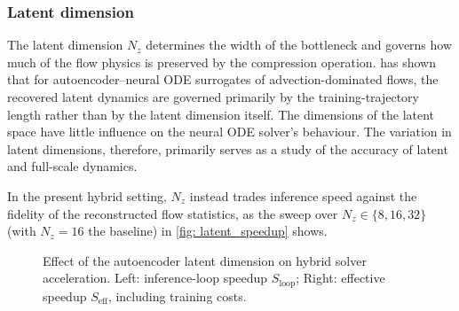 \subsubsection{Latent dimension}
The latent dimension $N_z$ determines the width of the bottleneck and governs how much of the flow physics is preserved by the compression operation. \textcite{Nair2024} has shown that for autoencoder--neural ODE surrogates of advection-dominated flows, the recovered latent dynamics are governed primarily by the training-trajectory length rather than by the latent dimension itself. The dimensions of the latent space have little influence on the neural ODE solver's behaviour. The variation in latent dimensions, therefore, primarily serves as a study of the accuracy of latent and full-scale dynamics. 

In the present hybrid setting, $N_z$ instead trades inference speed against the fidelity of the reconstructed flow statistics, as the sweep over $N_z \in \{8, 16, 32\}$ (with $N_z = 16$ the baseline) in \autoref{fig: latent_speedup} shows. 

\begin{figure}[htbp]
  \centering
  \caption{Effect of the autoencoder latent dimension on hybrid solver acceleration. Left: inference-loop speedup $S_\mathrm{loop}$;  Right: effective speedup $S_\mathrm{eff}$, including training costs.}
  \label{fig: latent_speedup}
\end{figure}

